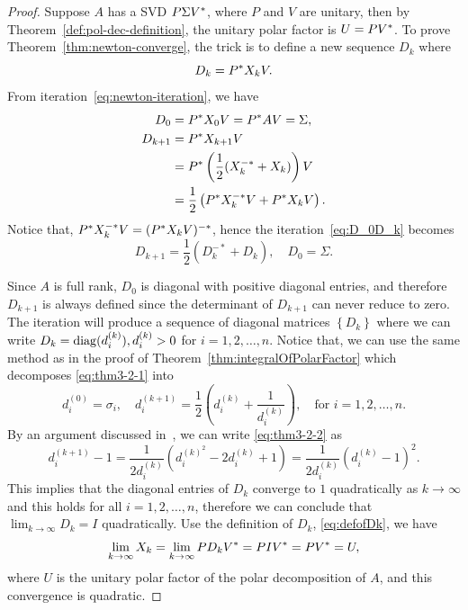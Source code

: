 \documentclass[12pt]{article}
\begin{document}
\begin{proof}
    Suppose $A$ has a SVD $P\Sigma V^*$, where $P$ and $V$ are unitary, then by Theorem~\ref{def:pol-dec-definition}, the unitary polar factor is $U = PV^*$. To prove Theorem~\ref{thm:newton-converge}, the trick is to define a new sequence $D_k$ where 
    \begin{equation}
        \label{eq:defofDk} 
        D_k = P^* X_k V.
    \end{equation} 
    From iteration~\eqref{eq:newton-iteration}, we have 
    \begin{equation}
        \label{eq:D_0D_k}
        \begin{aligned}
            D_0 &= P^* X_0 V = P^* A V = \Sigma,\\
            D_{k + 1} & = P^* X_{k+1} V \\
            & = P^* \left(\frac{1}{2} (X_k^{-*} + X_k)\right) V\\
            & = \frac{1}{2} \left(P^* X_k^{-*} V + P^* X_k V\right).
        \end{aligned}
    \end{equation}
    Notice that, $P^* X_k^{-*}V = (P^* X_k V)^{-*}$, hence the iteration~\eqref{eq:D_0D_k} becomes 
    \begin{equation}
        \label{eq:thm3-2-1} 
        D_{k + 1} = \frac{1}{2} \left(D_k^{-*} + D_k\right),\quad D_0 = \Sigma.
    \end{equation}

    Since $A$ is full rank, $D_0$ is diagonal with positive diagonal entries, and therefore $D_{k + 1}$ is always defined since the determinant of $D_{k+1}$ can never reduce to zero. The iteration will produce a sequence of diagonal matrices $\left\{D_k\right\}$ where we can write $D_k = \mathrm{diag}(d_i^{(k)}), d_i^{(k)} > 0$ for $i = 1,2,\dots,n$. Notice that, we can use the same method as in the proof of Theorem~\ref{thm:integralOfPolarFactor} which decomposes \eqref{eq:thm3-2-1} into 
    \begin{equation}
        \label{eq:thm3-2-2}
    	d_i^{(0)}=\sigma_i, \quad d_i^{(k+1)}=\frac{1}{2}\left(d_i^{(k)}+\frac{1}{d_i^{(k)}}\right),\quad \text{for $i = 1,2,\dots, n.$}
    \end{equation}
	By an argument discussed in~, we can write \eqref{eq:thm3-2-2} as 
    \begin{equation}\label{eq:quadConv}
        d_i^{(k+1)}-1=\frac{1}{2 d_i^{(k)}}\left(d_i^{(k)^2}-2 d_i^{(k)}+1\right)=\frac{1}{2 d_i^{(k)}}\left(d_i^{(k)}-1\right)^2.
    \end{equation}
    This implies that the diagonal entries of $D_k$ converge to $1$ quadratically as $k\to\infty$ and this holds for all $i = 1,2,\dots, n$, therefore we can conclude that $\lim_{k\to \infty}D_k = I$ quadratically. Use the definition of $D_k$, \eqref{eq:defofDk}, we have 
    \begin{equation}
        \notag
        \lim_{k\to\infty} X_k = \lim_{k\to\infty} PD_kV^* = PI V^* = PV^* = U,
    \end{equation}
    where $U$ is the unitary polar factor of the polar decomposition of $A$, and this convergence is quadratic. 


\end{proof}
\end{document}

